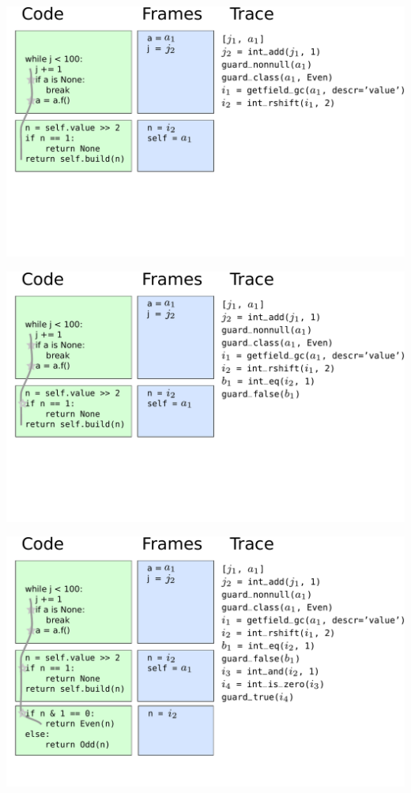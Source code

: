 \documentclass[utf8x]{beamer}
\begin{document}
\begin{frame}
  \includegraphics[scale=0.4]{figures/loop06}
\end{frame}

\begin{frame}
  \includegraphics[scale=0.4]{figures/loop07}
\end{frame}

\begin{frame}
  \includegraphics[scale=0.4]{figures/loop08}
\end{frame}
\end{document}

